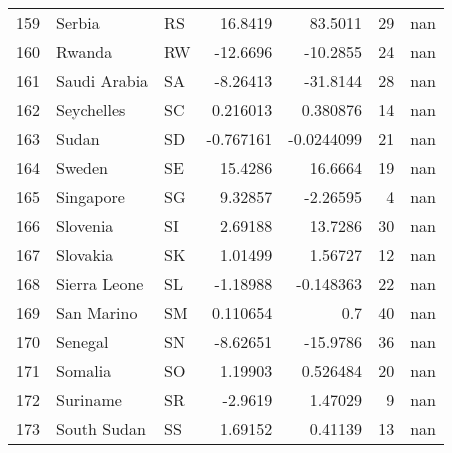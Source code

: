 \begin{tabular}{rllrrrr}
 159 & Serbia                                                   & RS         &   16.8419     &    83.5011    &     29 &          nan \\
 160 & Rwanda                                                   & RW         &  -12.6696     &   -10.2855    &     24 &          nan \\
 161 & Saudi Arabia                                             & SA         &   -8.26413    &   -31.8144    &     28 &          nan \\
 162 & Seychelles                                               & SC         &    0.216013   &     0.380876  &     14 &          nan \\
 163 & Sudan                                                    & SD         &   -0.767161   &    -0.0244099 &     21 &          nan \\
 164 & Sweden                                                   & SE         &   15.4286     &    16.6664    &     19 &          nan \\
 165 & Singapore                                                & SG         &    9.32857    &    -2.26595   &      4 &          nan \\
 166 & Slovenia                                                 & SI         &    2.69188    &    13.7286    &     30 &          nan \\
 167 & Slovakia                                                 & SK         &    1.01499    &     1.56727   &     12 &          nan \\
 168 & Sierra Leone                                             & SL         &   -1.18988    &    -0.148363  &     22 &          nan \\
 169 & San Marino                                               & SM         &    0.110654   &     0.7       &     40 &          nan \\
 170 & Senegal                                                  & SN         &   -8.62651    &   -15.9786    &     36 &          nan \\
 171 & Somalia                                                  & SO         &    1.19903    &     0.526484  &     20 &          nan \\
 172 & Suriname                                                 & SR         &   -2.9619     &     1.47029   &      9 &          nan \\
 173 & South Sudan                                              & SS         &    1.69152    &     0.41139   &     13 &          nan \\

\end{tabular}
